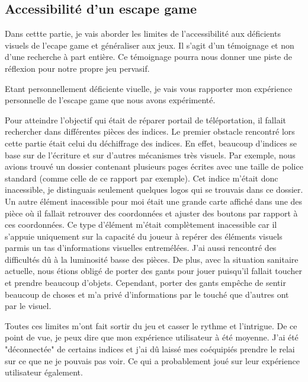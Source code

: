 \documentclass{article}
\begin{document}
	\subsection{Accessibilité d'un escape game}
		Dans cettte partie, je vais aborder les limites de l'accessibilité aux déficients visuels de l'ecape game et généraliser aux jeux. 
		Il s'agit d'un témoignage et non d'une recherche à part entière.
		Ce témoignage pourra nous donner une piste de réflexion pour notre propre jeu pervasif.\par
		Etant personnellement déficiente viuelle, je vais vous rapporter mon expérience personnelle de l'escape game que nous avons expérimenté.\par
		Pour atteindre l'objectif qui était de réparer portail de téléportation, il fallait rechercher dans différentes pièces des indices.
		Le premier obstacle rencontré lors cette partie était celui du déchiffrage des indices.
		En effet, beaucoup d'indices se base sur de l'écriture et sur d'autres mécanismes très visuels.
		Par exemple, nous avions trouvé un dossier contenant plusieurs pages écrites avec une taille de police standard (comme celle de ce rapport par exemple).
		Cet indice m'était donc inacessible, je distinguais seulement quelques logos qui se trouvais dans ce dossier.
		Un autre élément inacessible pour moi était une grande carte affiché dans une des pièce où il fallait retrouver des coordonnées et ajuster des boutons par rapport à ces coordonnées.
		Ce type d'élément m'était complètement inacessible car il s'appuie uniquement sur la capacité du joueur à repérer des éléments visuels parmis un tas d'informations visuelles entremélées.
		J'ai aussi rencontré des difficultés dû à la luminosité basse des pièces.
		De plus, avec la situation sanitaire actuelle, nous étions obligé de porter des gants pour jouer puisqu'il fallait toucher et prendre beaucoup d'objets.
		Cependant, porter des gants empêche de sentir beaucoup de choses et m'a privé d'informations par le touché que d'autres ont par le visuel.\par
		Toutes ces limites m'ont fait sortir du jeu et casser le rythme et l'intrigue.
		De ce point de vue, je peux dire que mon expérience utilisateur à été moyenne.
		J'ai été "déconnectée" de certains indices et j'ai dû laissé mes coéquipiés prendre le relai sur ce que ne je pouvais pas voir.
		Ce qui a probablement joué sur leur expérience utilisateur également.
\end{document}
